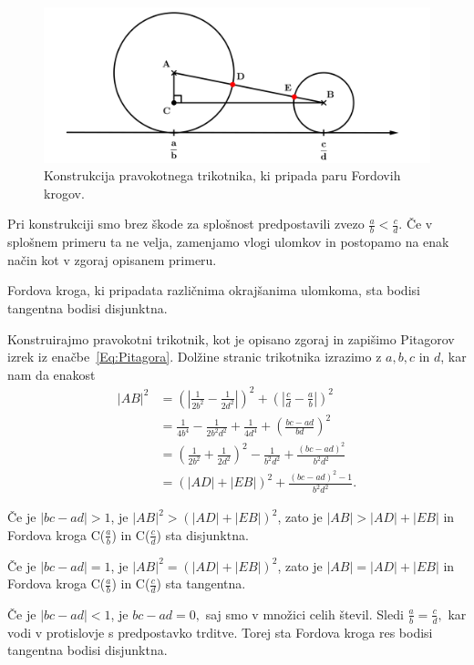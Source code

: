 \documentclass[mat1]{fmfdelo}
\begin{document}
\begin{figure}[h!]
\begin{center}
\includegraphics[scale=0.45]{pitagora1.png}
\caption{Konstrukcija pravokotnega trikotnika, ki pripada paru Fordovih krogov.}
\label{Fig:Pitagora}
\end{center}
\end{figure}

\begin{opomba}
Pri konstrukciji smo brez škode za splošnost predpostavili zvezo $\frac{a}{b} < \frac{c}{d}$. Če v splošnem primeru ta ne velja, zamenjamo vlogi ulomkov in postopamo na enak način kot v zgoraj opisanem primeru.
\end{opomba}
%

\begin{trditev}
\label{trd:FordDisjTang}
Fordova kroga, ki pripadata različnima okrajšanima ulomkoma, sta bodisi tangentna bodisi disjunktna.
\end{trditev}

\begin{dokaz}
Konstruirajmo pravokotni trikotnik, kot je opisano zgoraj in zapišimo Pitagorov izrek iz enačbe~\eqref{Eq:Pitagora}.
Dolžine stranic trikotnika izrazimo z $a, b, c$ in $d$, kar nam da enakost
%
\begin{align}
|AB|^2 
  &= \left ( \left| \frac{1}{2b^2} - \frac{1}{2d^2} \right| \right)^2  + \left ( \left| \frac{c}{d} - \frac{a}{b} \right| \right )^2 \nonumber \\ 
  &= \frac{1}{4b^4} - \frac{1}{2b^2d^2} + \frac{1}{4d^4} + \left (\frac{bc-ad}{bd} \right )^2 \nonumber \\
  &= \left (\frac{1}{2b^2} + \frac{1}{2d^2} \right )^2 - \frac{1}{b^2d^2} + \frac{(bc-ad)^2}{b^2d^2} \nonumber \\
  &= (|AD| + |EB|)^2 + \frac{(bc-ad)^2-1}{b^2d^2}.
\end{align}

Če je $|bc-ad|>1$, je $|AB|^2 > (|AD| + |EB|)^2$, zato je $|AB| > |AD| + |EB|$ in Fordova kroga C($\frac{a}{b}$) in C($\frac{c}{d}$) sta disjunktna.

Če je $|bc-ad|=1$, je $|AB|^2 = (|AD| + |EB|)^2$, zato je $|AB| = |AD| + |EB|$ in Fordova kroga C($\frac{a}{b}$) in C($\frac{c}{d}$) sta tangentna.

Če je $|bc-ad|<1$, je $bc-ad = 0,$ saj smo v množici celih števil. Sledi $\frac{a}{b} = \frac{c}{d},$ kar vodi v protislovje s predpostavko trditve.
Torej sta Fordova kroga res bodisi tangentna bodisi disjunktna.
\end{dokaz}
\end{document}
